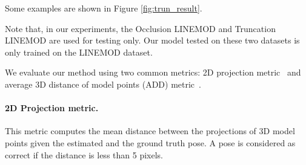\documentclass[10pt,twocolumn,letterpaper]{article}
\begin{document}

Some examples are shown in Figure \ref{fig:trun_result}. 

Note that, in our experiments, the Occlusion LINEMOD and Truncation LINEMOD are used for testing only. Our model tested on these two datasets is only trained on the LINEMOD dataset.



We evaluate our method using two common metrics: 2D projection metric~\cite{brachmann2016uncertainty} and average 3D distance of model points (ADD) metric~\cite{hinterstoisser2012model}.

\paragraph{2D Projection metric.} This metric computes the mean distance between the projections of 3D model points given the estimated and the ground truth pose. A pose is considered as correct if the distance is less than 5 pixels.
\end{document}
